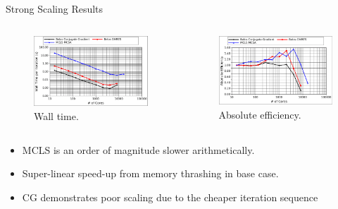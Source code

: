 \documentclass{beamer}
\begin{document}
\begin{frame}{Strong Scaling Results}

  \begin{columns}

    \begin{column}{0.5\textwidth}

      \begin{figure}[htpb!]
        \begin{center}
          \includegraphics[width=2.4in]{titan_pure_strong_time.pdf}
        \end{center}
        \caption{Wall time.}
      \end{figure}

    \end{column}

    \begin{column}{0.5\textwidth}

      \begin{figure}[htpb!]
        \begin{center}
          \includegraphics[width=2.4in]{titan_pure_strong.pdf}
        \end{center}
        \caption{Absolute efficiency.}
      \end{figure}

    \end{column}

  \end{columns}

  \begin{itemize}
  \item MCLS is an order of magnitude slower arithmetically.
  \item Super-linear speed-up from memory thrashing in base case.
  \item CG demonstrates poor scaling due to the cheaper iteration
    sequence
  \end{itemize}

\end{frame}
\end{document}
